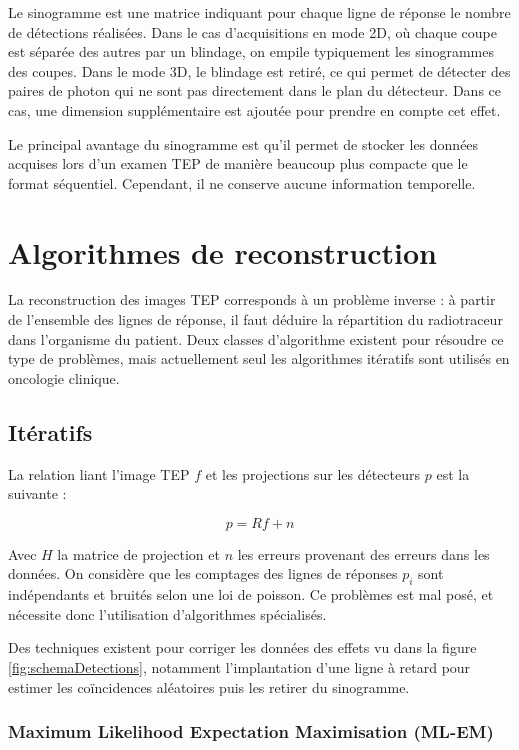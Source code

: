 Le sinogramme est une matrice indiquant pour chaque ligne de réponse le nombre de détections réalisées. Dans le cas d'acquisitions en mode 2D, où chaque coupe est séparée des autres par un blindage, on empile typiquement les sinogrammes des coupes. Dans le mode 3D, le blindage est retiré, ce qui permet de détecter des paires de photon qui ne sont pas directement dans le plan du détecteur. Dans ce cas, une dimension supplémentaire est ajoutée pour prendre en compte cet effet.

Le principal avantage du sinogramme est qu'il permet de stocker les données acquises lors d'un examen TEP de manière beaucoup plus compacte que le format séquentiel. Cependant, il ne conserve aucune information temporelle.


\chapter{Algorithmes de reconstruction}

La reconstruction des images TEP corresponds à un problème inverse : à partir de l'ensemble des lignes de réponse, il faut déduire la répartition du radiotraceur dans l'organisme du patient. Deux classes d'algorithme existent pour résoudre ce type de problèmes, mais actuellement seul les algorithmes itératifs sont utilisés en oncologie clinique. 

	\section{Itératifs}

La relation liant l'image TEP $f$ et les projections sur les détecteurs $p$ est la suivante :

\begin{equation}
	p = R f + n
\end{equation}

Avec $H$ la matrice de projection et $n$ les erreurs provenant des erreurs dans les données. On considère que les comptages des lignes de réponses $p_i$ sont indépendants et bruités selon une loi de poisson. Ce problèmes est mal posé, et nécessite donc l'utilisation d'algorithmes spécialisés. 

Des techniques existent pour corriger les données des effets vu dans la figure \ref{fig:schemaDetections}, notamment l'implantation d'une ligne à retard pour estimer les coïncidences aléatoires puis les retirer du sinogramme.

		\subsection{Maximum Likelihood Expectation Maximisation (ML-EM) }


